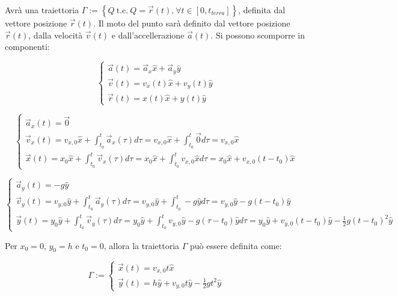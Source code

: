\documentclass{article}
\numberwithin{equation}{subsection}
\begin{document}
Avrà una traiettoria $\Gamma := \left\{Q\:\mbox{t.c.}\:Q=\vec{r}(t)\mbox{,}\:\forall t\in \left[0, t_{terra}\right] \right\}$, 
definita dal vettore posizione $\vec{r}(t)$. Il moto del 
punto sarà definito dal vettore posizione $\vec{r}(t)$, dalla velocità 
$\vec{v}(t)$ e dall'accellerazione $\vec{a}(t)$.
Si possono scomporre in componenti:

\begin{equation}
    \begin{cases}
        \vec{a}(t) = \vec{a}_x\hat{x} +\vec{a}_y\hat{y}\\
        \vec{v}(t) = v_x(t)\hat{x} + v_y(t)\hat{y}\\
        \vec{r}(t) = x(t)\hat{x} + y(t)\hat{y}
    \end{cases}
\end{equation}

\begin{equation*}
    \begin{cases}
        \vec{a}_x(t) = \vec{0}\\
        \vec{v}_x(t) =\displaystyle v_{x,0}\hat{x}+\int_{t_0}^{t}\vec{a}_x(\tau)d\tau=v_{x,0}\hat{x}+ \int_{t_0}^{t}\vec{0}d\tau=v_{x,0}\hat{x}\\
        \vec{x}(t) = \displaystyle x_0\hat{x}+\int_{t_0}^{t}\vec{v}_x(\tau)d\tau = x_0\hat{x}+\int_{t_0}^{t}v_{x,0}\hat{x}d\tau=x_0\hat{x}+v_{x,0}(t-t_0)\hat{x}
    \end{cases}
\end{equation*}

\begin{equation*}
    \begin{cases}
        \vec{a}_y(t)=-g\hat{y}\\
        \vec{v}_y(t)=\displaystyle v_{y,0}\hat{y}+\int_{t_0}^{t}\vec{a}_y(\tau)d\tau=v_{y,0}\hat{y}+\int_{t_0}^{t}-g\hat{y}d\tau=v_{y,0}\hat{y}-g(t-t_0)\hat{y}\\
        \vec{y}(t)=y_0\hat{y} +\displaystyle\int_{t_0}^{t}\vec{v}_y(\tau)d\tau=y_0\hat{y}+\int_{t_0}^{t}v_{y,0}\hat{y}-g(\tau-t_0)\hat{y}d\tau=
        y_0\hat{y}+v_{y,0}(t-t_0)\hat{y}-\frac{1}{2}g(t-t_0)^{2}\hat y
    \end{cases}
\end{equation*}

Per $x_0 = 0$, $y_0 = h$ e $t_0 = 0$, allora la traiettoria 
$\Gamma$ può essere definita come:

\begin{equation}
    \Gamma:=
    \begin{cases}
        \vec{x}(t)=v_{x,0}t\hat{x}\\
        \vec{y}(t)=\displaystyle h\hat{y}+v_{y,0}t\hat{y}-\frac{1}{2}gt^{2}\hat y
    \end{cases}
\end{equation}
\end{document}

